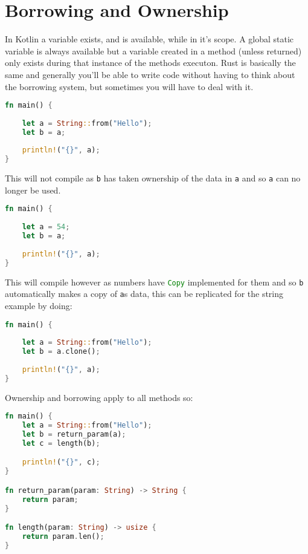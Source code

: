 \documentclass[a4paper,11pt]{article}
\begin{document}
\newpage
\section{Borrowing and Ownership}
In Kotlin a variable exists, and is available, while in it's scope. A global static variable is always available but a variable created in a method (unless returned) only exists during that instance of the methods executon. Rust is basically the same and generally you'll be able to write code without having to think about the borrowing system, but sometimes you will have to deal with it.
\begin{lstlisting}[language=Rust,frame=single]
fn main() {
    
    let a = String::from("Hello");
    let b = a;
    
    println!("{}", a);
}
\end{lstlisting}

This will not compile as \lstinline{b} has taken ownership of the data in \lstinline{a} and so \lstinline{a} can no longer be used.

\begin{lstlisting}[language=Rust,frame=single,caption={Listing B}]
fn main() {
    
    let a = 54;
    let b = a;
    
    println!("{}", a);
}
\end{lstlisting}

This will compile however as numbers have \lstinline[language=Rust]{Copy} implemented for them and so \lstinline{b} automatically makes a copy of \lstinline{a}s data, this can be replicated for the string example by doing:

\begin{lstlisting}[language=Rust,frame=single]
fn main() {
    
    let a = String::from("Hello");
    let b = a.clone();
    
    println!("{}", a);
}
\end{lstlisting}

Ownership and borrowing apply to all methods so:

\begin{lstlisting}[language=Rust,frame=single]
fn main() {
    let a = String::from("Hello");
    let b = return_param(a);
    let c = length(b);

    println!("{}", c);
}

fn return_param(param: String) -> String {
	return param;
}

fn length(param: String) -> usize {
	return param.len();
}
\end{lstlisting}
\end{document}
